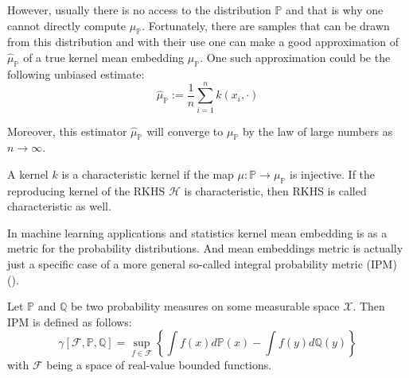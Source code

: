 However, usually there is no access to the distribution $\mathds{P}$ and that is why one cannot directly compute $\mu_{\mathds{P}}$. Fortunately, there are samples that can be drawn from this distribution and with their use one can make a good approximation of $\hat{\mu}_{\mathds{P}}$ of a true kernel mean embedding $\mu_{\mathds{P}}$. One such approximation could be the following unbiased estimate:
\begin{equation}
    \hat{\mu}_{\mathds{P}} := \frac{1}{n} \sum_{i=1}^n k(x_i, \cdot)
\end{equation}

Moreover, this estimator $\hat{\mu}_{\mathds{P}}$  will converge to $\mu_{\mathds{P}}$ by the law of large numbers as $n \rightarrow \infty$.

\begin{definition}
    A kernel $k$ is a characteristic kernel if the map $\mu: \mathds{P} \rightarrow \mu_{\mathds{P}}$ is injective. If the reproducing kernel of the RKHS $\mathscr{H}$ is characteristic, then RKHS is called characteristic as well. 
\end{definition}

In machine learning applications and statistics kernel mean embedding is as a metric for the probability distributions. And mean embeddings metric is actually just a specific case of a more general so-called integral probability metric (IPM) (\cite{Mueller_1997}).

\begin{definition}[IPM]
    Let $\mathds{P}$ and  $\mathds{Q}$ be two probability measures on some measurable space $\mathcal{X}$. Then IPM is defined as follows:
    \begin{equation}
        \gamma [\mathcal{F}, \mathds{P}, \mathds{Q}] = \sup_{f\in \mathcal{F}} \left\{ \int f(x) d\mathds{P}(x) -  \int f(y) d\mathds{Q}(y) \right\}
    \label{eq:ipm}
    \end{equation}
    with $\mathcal{F}$ being a space of real-value bounded functions.
\end{definition}